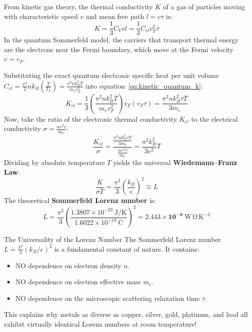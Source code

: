 \documentclass[11pt,a4paper]{article}
\begin{document}
From kinetic gas theory, the thermal conductivity $K$ of a gas of particles moving with characteristic speed $v$ and mean free path $l = v\tau$ is:
\begin{equation}
K = \frac{1}{3} C_V v l = \frac{1}{3} C_{el} v_F^2 \tau
\label{eq:kinetic_quantum_k}
\end{equation}
In the quantum Sommerfeld model, the carriers that transport thermal energy are the electrons near the Fermi boundary, which move at the Fermi velocity $v = v_F$.

Substituting the exact quantum electronic specific heat per unit volume $C_{el} = \frac{\pi^2}{2} n k_B \left(\frac{T}{T_F}\right) = \frac{\pi^2 n k_B^2 T}{m_e v_F^2}$ into equation~\eqref{eq:kinetic_quantum_k}:
\begin{equation}
K_{el} = \frac{1}{3}\left( \frac{\pi^2 n k_B^2 T}{m_e v_F^2} \right) v_F (v_F \tau) = \frac{\pi^2 n k_B^2 \tau T}{3m_e}
\label{eq:quantum_thermal_conductivity}
\end{equation}
Now, take the ratio of the electronic thermal conductivity $K_{el}$ to the electrical conductivity $\sigma = \frac{ne^2\tau}{m_e}$:
\begin{equation}
\frac{K_{el}}{\sigma} = \frac{\frac{\pi^2 n k_B^2 \tau T}{3m_e}}{\frac{n e^2\tau}{m_e}} = \frac{\pi^2 k_B^2}{3 e^2} T
\end{equation}
Dividing by absolute temperature $T$ yields the universal \textbf{Wiedemann--Franz Law}:
\begin{equation}
\boxed{\frac{K}{\sigma T} = \frac{\pi^2}{3}\left(\frac{k_B}{e}\right)^2 \equiv L}
\label{eq:quantum_wf_law}
\end{equation}
The theoretical \textbf{Sommerfeld Lorenz number} is:
\begin{equation}
L = \frac{\pi^2}{3}\left(\frac{1.3807 \times 10^{-23}\ \mathrm{J/K}}{1.6022 \times 10^{-19}\ \mathrm{C}}\right)^2 = \mathbf{2.443 \times 10^{-8}\ \mathrm{W\,\Omega\,K^{-2}}}
\label{eq:sommerfeld_lorenz_val}
\end{equation}

\begin{takeawaybox}{The Universality of the Lorenz Number}
The Sommerfeld Lorenz number $L = \frac{\pi^2}{3}(k_B/e)^2$ is a fundamental constant of nature. It contains:
\begin{itemize}
    \item NO dependence on electron density $n$.
    \item NO dependence on electron effective mass $m_e$.
    \item NO dependence on the microscopic scattering relaxation time $\tau$.
\end{itemize}
This explains why metals as diverse as copper, silver, gold, platinum, and lead all exhibit virtually identical Lorenz numbers at room temperature!
\end{takeawaybox}
\end{document}
